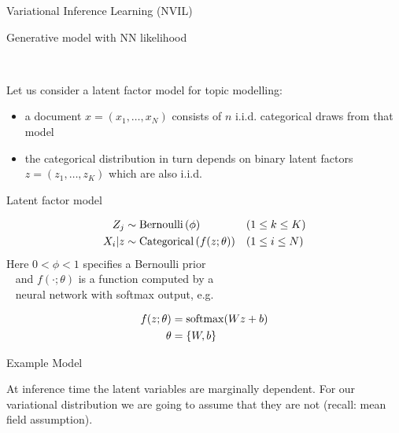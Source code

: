 

\begin{frame}{Variational Inference Learning (NVIL)}

Generative model with NN likelihood
\pause

~

Let us consider a latent factor model for topic modelling: \pause

\begin{itemize}
	\item a document $ x = (x_{1},\ldots,x_{N})$ consists of $ n $ i.i.d. categorical draws from that model \pause
	\item the categorical distribution in turn depends on  binary latent factors $ z = (z_{1},\ldots,z_{K}) $ which are also i.i.d. 
\end{itemize}


\end{frame}

\begin{frame}{Latent factor model}

\begin{equation*}
\begin{aligned}
Z_{j} &\sim \operatorname{Bernoulli}\left(\phi\right) && (1 \leq k \leq K) \\ 
X_{i}|z &\sim \operatorname{Categorical}\left(f(z; \theta)\right) && (1 \leq i \leq N)
\end{aligned}
\end{equation*} 
Here $0 < \phi < 1$ specifies a Bernoulli prior \\
~ and $ f(\cdot; \theta) $ is a function computed by a \\
~ neural network with softmax output, e.g.

\begin{equation*}
\begin{aligned}
f(z; \theta) &= \operatorname{softmax}(Wz + b) \\
\theta &= \{W, b\}
\end{aligned}
\end{equation*}

\end{frame}

\begin{frame}{Example Model}
\begin{figure}
\center
{}
\end{figure}
At inference time the latent variables are marginally dependent. For our variational distribution
we are going to assume that they are not (recall: mean field assumption).
\end{frame}

